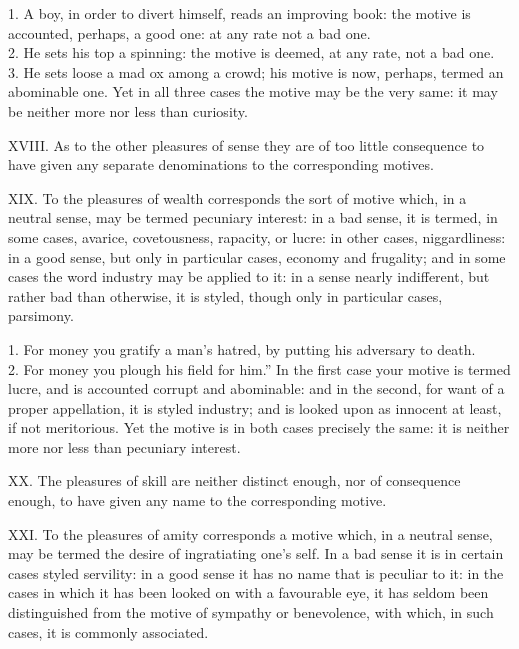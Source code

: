 \documentclass[12pt]{report}
\begin{document}
1. A boy, in order to divert himself, reads an improving book: the
motive is accounted, perhaps, a good one: at any rate not a bad one.\\
2. He sets his top a spinning: the motive is deemed, at any rate, not a
bad one.\\
3. He sets loose a mad ox among a crowd; his motive is now, perhaps,
termed an abominable one. Yet in all three cases the motive may be the
very same: it may be neither more nor less than curiosity.

XVIII. As to the other pleasures of sense they are of too little
consequence to have given any separate denominations to the
corresponding motives.

XIX. To the pleasures of wealth corresponds the sort of motive which, in
a neutral sense, may be termed pecuniary interest: in a bad sense, it is
termed, in some cases, avarice, covetousness, rapacity, or lucre: in
other cases, niggardliness: in a good sense, but only in particular
cases, economy and frugality; and in some cases the word industry may be
applied to it: in a sense nearly indifferent, but rather bad than
otherwise, it is styled, though only in particular cases, parsimony.

1. For money you gratify a man's hatred, by putting his adversary to
death.\\
2. For money you plough his field for him.'' In the first case
your motive is termed lucre, and is accounted corrupt and abominable:
and in the second, for want of a proper appellation, it is styled
industry; and is looked upon as innocent at least, if not meritorious.
Yet the motive is in both cases precisely the same: it is neither more
nor less than pecuniary interest.

XX. The pleasures of skill are neither distinct enough, nor of
consequence enough, to have given any name to the corresponding motive.

XXI. To the pleasures of amity corresponds a motive which, in a neutral
sense, may be termed the desire of ingratiating one's self. In a bad
sense it is in certain cases styled servility: in a good sense it has no
name that is peculiar to it: in the cases in which it has been looked on
with a favourable eye, it has seldom been distinguished from the motive
of sympathy or benevolence, with which, in such cases, it is commonly
associated.
\end{document}
